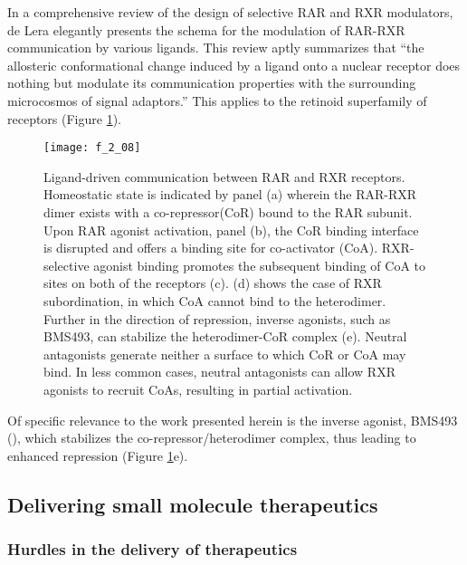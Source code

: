 \begin{refsection}
In a comprehensive review of the design of selective RAR and RXR modulators, de
Lera elegantly presents the schema for the modulation of RAR-RXR
communication by various ligands. This review aptly summarizes that ``the
allosteric conformational change induced by a ligand onto a nuclear receptor
does nothing but modulate its communication properties with the surrounding
microcosmos of signal adaptors.''\cite{DeLera2007} This applies to the retinoid
superfamily of receptors (Figure \ref{fig:RAR_communication}).
\begin{figure}[h!] \centering \texttt{[image: f\_2\_08]}
    \caption[Ligand-driven communication between RAR and RXR
    receptors.]{Ligand-driven communication between RAR and RXR receptors.
        Homeostatic state is indicated by panel (a) wherein the RAR-RXR dimer
        exists with a co-repressor(CoR) bound to the RAR subunit. Upon RAR
        agonist activation, panel (b), the CoR binding interface is disrupted
        and offers a binding site for co-activator (CoA). RXR-selective agonist
        binding promotes the subsequent binding of CoA to sites on both of the
        receptors (c). (d) shows the case of RXR subordination, in which CoA
        cannot bind to the heterodimer. Further in the direction of repression,
        inverse agonists, such as BMS493, can stabilize the heterodimer-CoR
        complex (e). Neutral antagonists generate neither a surface to which CoR or
        CoA may bind. In less common cases, neutral antagonists can allow RXR
        agonists to recruit CoAs, resulting in partial activation.\cite{DeLera2007}}\label{fig:RAR_communication} \end{figure}
Of specific relevance to the work presented herein is the inverse agonist,
BMS493 (), which
stabilizes the co-repressor/heterodimer complex, thus leading to enhanced
repression (Figure \ref{fig:RAR_communication}e).\cite{Germain2002} 

\subsection{Delivering small molecule therapeutics}

\subsubsection{Hurdles in the delivery of therapeutics}


\end{refsection}
